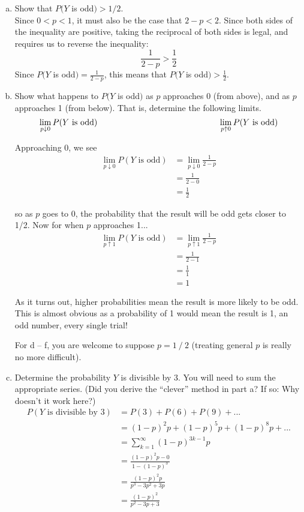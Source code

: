 \documentclass{scrartcl}
\begin{document}
\begin{enumerate}
\begin{enumerate}[a)]
\item Show that $P(Y$ is odd$) > 1/2$.\\
Since $0<p<1$, it must also be the case that $2 - p < 2$. Since both sides of the inequality are positive, taking the reciprocal of both sides is legal, and requires us to reverse the inequality: $$\frac{1}{2-p} > \frac{1}{2}$$ Since $P(Y$ is odd$) = \frac{1}{2-p}$, this means that  $P(Y$ is odd$) > \frac{1}{2}$.\\

\item Show what happens to $P(Y$ is odd$)$ as $p$ approaches 0 (from above), and as $p$ approaches 1 (from below). That is, determine the following limits.\\

$$\lim_{p\downarrow0}P(Y\text{ is odd})\text{\hspace{2in}}\lim_{p\uparrow0}P(Y\text{ is odd})$$

Approaching 0, we see
\begin{align*}
  \lim_{p\downarrow0}P(Y\text{ is odd}) &= \lim_{p\downarrow0}\frac{1}{2-p}\\
  &= \frac{1}{2-0}\\
  &= \frac{1}{2}
\end{align*}

so as $p$ goes to 0, the probability that the result will be odd gets closer to 1/2. Now for when $p$ approaches 1...
\begin{align*}
  \lim_{p\uparrow1}P(Y\text{ is odd}) &= \lim_{p\uparrow1}\frac{1}{2-p}\\
  &= \frac{1}{2-1}\\
  &= \frac{1}{1}\\
  &= 1
\end{align*}

As it turns out, higher probabilities mean the result is more likely to be odd. This is almost obvious as a probability of 1 would mean the result is 1, an odd number, every single trial!


For d – f, you are welcome to suppose $p = 1⁄2$ (treating general $p$ is really no more difficult).
\item Determine the probability $Y$ is divisible by 3. You will need to sum the appropriate series. (Did you derive the “clever” method in part a? If so: Why doesn’t it work here?)\\

  \begin{align*}
    P(Y\text{ is divisible by 3}) &= P(3) + P(6) + P(9) + ...\\
    &= (1-p)^2p + (1-p)^5p + (1-p)^8p + ...\\
    &= \sum_{k=1}^\infty(1-p)^{3k-1}p\\
    &= \frac{(1-p)^2p - 0}{1 - (1-p)^3}\\
    &= \frac{(1-p)^2p}{p^3-3p^2+3p}\\
    &= \frac{(1-p)^2}{p^2-3p+3}
  \end{align*}


\end{enumerate}
\end{enumerate}
\end{document}
